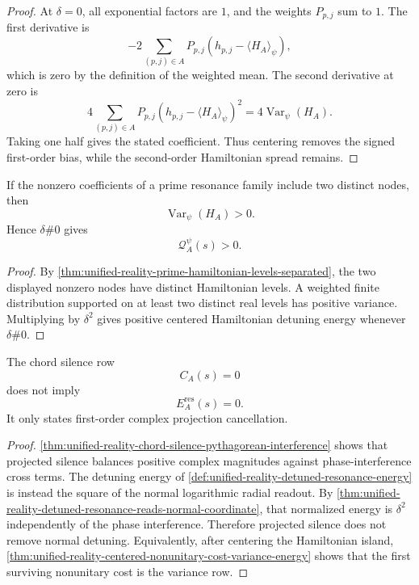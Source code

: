 \begin{proof}
At $\delta=0$, all exponential factors are $1$, and the weights
$P_{p,j}$ sum to $1$.  The first derivative is
$$
-2\sum_{(p,j)\in A}
P_{p,j}
\left(h_{p,j}-\langle H_A\rangle_{\psi}\right),
$$
which is zero by the definition of the weighted mean.  The second
derivative at zero is
$$
4\sum_{(p,j)\in A}
P_{p,j}
\left(h_{p,j}-\langle H_A\rangle_{\psi}\right)^2
=
4\operatorname{Var}_{\psi}(H_A).
$$
Taking one half gives the stated coefficient.  Thus centering removes
the signed first-order bias, while the second-order Hamiltonian spread
remains.
\end{proof}

\begin{corollary}
\label{cor:unified-reality-nontrivial-resonance-support-positive-variance}
If the nonzero coefficients of a prime resonance family include two
distinct nodes, then
$$
\operatorname{Var}_{\psi}(H_A)>0.
$$
Hence $\delta\#0$ gives
$$
\mathcal Q_A^{\psi}(s)>0.
$$
\end{corollary}

\begin{proof}
By
\autoref{thm:unified-reality-prime-hamiltonian-levels-separated},
the two displayed nonzero nodes have distinct Hamiltonian levels.  A
weighted finite distribution supported on at least two distinct real
levels has positive variance.  Multiplying by $\delta^2$ gives positive
centered Hamiltonian detuning energy whenever $\delta\#0$.
\end{proof}

\begin{theorem}
\label{thm:unified-reality-projected-silence-does-not-cancel-detuning-energy}
The chord silence row
$$
C_A(s)=0
$$
does not imply
$$
E_A^{\mathrm{res}}(s)=0.
$$
It only states first-order complex projection cancellation.
\end{theorem}

\begin{proof}
\autoref{thm:unified-reality-chord-silence-pythagorean-interference}
shows that projected silence balances positive complex magnitudes against
phase-interference cross terms.  The detuning energy of
\autoref{def:unified-reality-detuned-resonance-energy} is instead the
square of the normal logarithmic radial readout.  By
\autoref{thm:unified-reality-detuned-resonance-reads-normal-coordinate},
that normalized energy is $\delta^2$ independently of the phase
interference.  Therefore projected silence does not remove normal
detuning.
Equivalently, after centering the Hamiltonian island,
\autoref{thm:unified-reality-centered-nonunitary-cost-variance-energy}
shows that the first surviving nonunitary cost is the variance row.
\end{proof}

